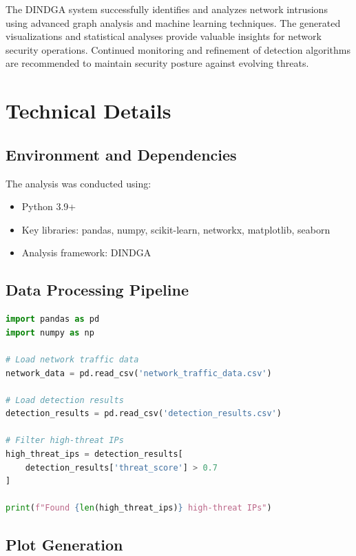 \documentclass[12pt,a4paper]{report}
\begin{document}
The DINDGA system successfully identifies and analyzes network intrusions using advanced graph analysis and machine learning techniques. The generated visualizations and statistical analyses provide valuable insights for network security operations. Continued monitoring and refinement of detection algorithms are recommended to maintain security posture against evolving threats.

\appendix

\chapter{Technical Details}

\section{Environment and Dependencies}

The analysis was conducted using:
\begin{itemize}
    \item Python 3.9+
    \item Key libraries: pandas, numpy, scikit-learn, networkx, matplotlib, seaborn
    \item Analysis framework: DINDGA
\end{itemize}

\section{Data Processing Pipeline}

\begin{lstlisting}[language=Python, caption=Basic Data Loading Example]
import pandas as pd
import numpy as np

# Load network traffic data
network_data = pd.read_csv('network_traffic_data.csv')

# Load detection results
detection_results = pd.read_csv('detection_results.csv')

# Filter high-threat IPs
high_threat_ips = detection_results[
    detection_results['threat_score'] > 0.7
]

print(f"Found {len(high_threat_ips)} high-threat IPs")
\end{lstlisting}

\section{Plot Generation}
\end{document}
